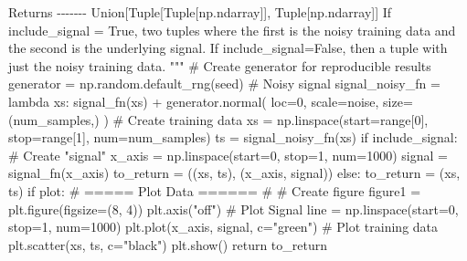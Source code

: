 \documentclass[
  0.875em,
  letterpaper,
  DIV=11,
  numbers=noendperiod]{scrartcl}
\newenvironment{Shaded}{\begin{snugshade}}{\end{snugshade}}
\newcommand{\BuiltInTok}[1]{\textcolor[rgb]{0.00,0.23,0.31}{#1}}
\newcommand{\CommentTok}[1]{\textcolor[rgb]{0.37,0.37,0.37}{#1}}
\newcommand{\ControlFlowTok}[1]{\textcolor[rgb]{0.00,0.23,0.31}{#1}}
\newcommand{\DecValTok}[1]{\textcolor[rgb]{0.68,0.00,0.00}{#1}}
\newcommand{\KeywordTok}[1]{\textcolor[rgb]{0.00,0.23,0.31}{#1}}
\newcommand{\NormalTok}[1]{\textcolor[rgb]{0.00,0.23,0.31}{#1}}
\newcommand{\OperatorTok}[1]{\textcolor[rgb]{0.37,0.37,0.37}{#1}}
\newcommand{\StringTok}[1]{\textcolor[rgb]{0.13,0.47,0.30}{#1}}
\begin{document}
\begin{Shaded}
\begin{Highlighting}[]
\CommentTok{    Returns}
\CommentTok{    {-}{-}{-}{-}{-}{-}{-}}
\CommentTok{    Union[Tuple[Tuple[np.ndarray]], Tuple[np.ndarray]]}
\CommentTok{        If include\_signal = True, two tuples where the first is the noisy}
\CommentTok{        training data and the second is the underlying signal. If include\_signal=False,}
\CommentTok{        then a tuple with just the noisy training data.}
\CommentTok{    """}
    \CommentTok{\# Create generator for reproducible results}
\NormalTok{    generator }\OperatorTok{=}\NormalTok{ np.random.default\_rng(seed)}
    \CommentTok{\# Noisy signal}
\NormalTok{    signal\_noisy\_fn }\OperatorTok{=} \KeywordTok{lambda}\NormalTok{ xs: signal\_fn(xs) }\OperatorTok{+}\NormalTok{ generator.normal(}
\NormalTok{        loc}\OperatorTok{=}\DecValTok{0}\NormalTok{, scale}\OperatorTok{=}\NormalTok{noise, size}\OperatorTok{=}\NormalTok{(num\_samples,)}
\NormalTok{    )}
    \CommentTok{\# Create training data}
\NormalTok{    xs }\OperatorTok{=}\NormalTok{ np.linspace(start}\OperatorTok{=}\BuiltInTok{range}\NormalTok{[}\DecValTok{0}\NormalTok{], stop}\OperatorTok{=}\BuiltInTok{range}\NormalTok{[}\DecValTok{1}\NormalTok{], num}\OperatorTok{=}\NormalTok{num\_samples)}
\NormalTok{    ts }\OperatorTok{=}\NormalTok{ signal\_noisy\_fn(xs)}
    \ControlFlowTok{if}\NormalTok{ include\_signal:}
        \CommentTok{\# Create "signal"}
\NormalTok{        x\_axis }\OperatorTok{=}\NormalTok{ np.linspace(start}\OperatorTok{=}\DecValTok{0}\NormalTok{, stop}\OperatorTok{=}\DecValTok{1}\NormalTok{, num}\OperatorTok{=}\DecValTok{1000}\NormalTok{)}
\NormalTok{        signal }\OperatorTok{=}\NormalTok{ signal\_fn(x\_axis)}
\NormalTok{        to\_return }\OperatorTok{=}\NormalTok{ ((xs, ts), (x\_axis, signal))}
    \ControlFlowTok{else}\NormalTok{:}
\NormalTok{        to\_return }\OperatorTok{=}\NormalTok{ (xs, ts)}
    \ControlFlowTok{if}\NormalTok{ plot:}
        \CommentTok{\# ===== Plot Data ====== \#}
        \CommentTok{\# Create figure}
\NormalTok{        figure1 }\OperatorTok{=}\NormalTok{ plt.figure(figsize}\OperatorTok{=}\NormalTok{(}\DecValTok{8}\NormalTok{, }\DecValTok{4}\NormalTok{))}
\NormalTok{        plt.axis(}\StringTok{"off"}\NormalTok{)}
        \CommentTok{\# Plot Signal}
\NormalTok{        line }\OperatorTok{=}\NormalTok{ np.linspace(start}\OperatorTok{=}\DecValTok{0}\NormalTok{, stop}\OperatorTok{=}\DecValTok{1}\NormalTok{, num}\OperatorTok{=}\DecValTok{1000}\NormalTok{)}
\NormalTok{        plt.plot(x\_axis, signal, c}\OperatorTok{=}\StringTok{"green"}\NormalTok{)}
        \CommentTok{\# Plot training data}
\NormalTok{        plt.scatter(xs, ts, c}\OperatorTok{=}\StringTok{"black"}\NormalTok{)}
\NormalTok{        plt.show()}
    \ControlFlowTok{return}\NormalTok{ to\_return}


\end{Highlighting}
\end{Shaded}
\end{document}
